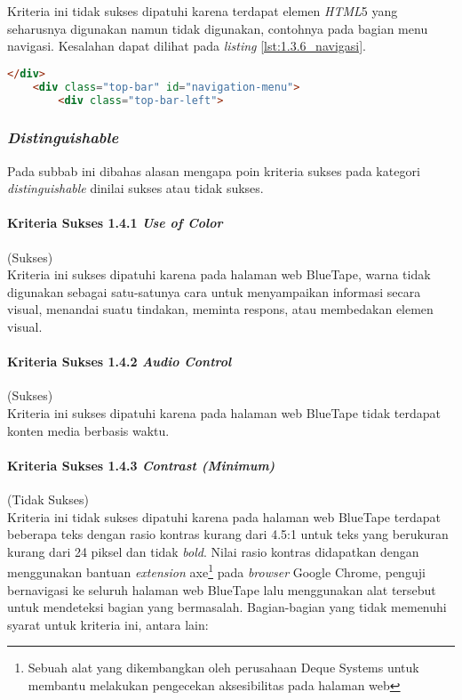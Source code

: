 Kriteria ini tidak sukses dipatuhi karena terdapat elemen \textit{HTML}5 yang seharusnya digunakan namun tidak digunakan, contohnya pada bagian menu navigasi. Kesalahan dapat dilihat pada \textit{listing} \ref{lst:1.3.6_navigasi}.

\begin{lstlisting}[frame=single, label={lst:1.3.6_navigasi}, language=HTML, caption=Pelanggaran Kriteria Sukses 1.3.6 pada Menu Navigasi]
    </div>
    <div class="top-bar" id="navigation-menu">
        <div class="top-bar-left">
\end{lstlisting}

\subsubsection{\textit{Distinguishable}}
\label{subsubsec:kepatuhan_bluetape_distinguishable}
Pada subbab ini dibahas alasan mengapa poin kriteria sukses pada kategori \textit{distinguishable} dinilai sukses atau tidak sukses.

\paragraph{Kriteria Sukses 1.4.1 \textit{Use of Color}}
\label{par:kepatuhan_bluetape_kriteria_sukses_1.4.1}
(Sukses)\\

Kriteria ini sukses dipatuhi karena pada halaman web BlueTape, warna tidak digunakan sebagai satu-satunya cara untuk menyampaikan informasi secara visual, menandai suatu tindakan, meminta respons, atau membedakan elemen visual.

\paragraph{Kriteria Sukses 1.4.2 \textit{Audio Control}}
\label{par:kepatuhan_bluetape_kriteria_sukses_1.4.2}
(Sukses)\\

Kriteria ini sukses dipatuhi karena pada halaman web BlueTape tidak terdapat konten media berbasis waktu.

\paragraph{Kriteria Sukses 1.4.3 \textit{Contrast (Minimum)}}
\label{par:kepatuhan_bluetape_kriteria_sukses_1.4.3}
(Tidak Sukses)\\

Kriteria ini tidak sukses dipatuhi karena pada halaman web BlueTape terdapat beberapa teks dengan rasio kontras kurang dari 4.5:1 untuk teks yang berukuran kurang dari 24 piksel dan tidak \textit{bold}. Nilai rasio kontras didapatkan dengan menggunakan bantuan \textit{extension} axe\footnote{Sebuah alat yang dikembangkan oleh perusahaan Deque Systems untuk membantu melakukan pengecekan aksesibilitas pada halaman web} pada \textit{browser} Google Chrome, penguji bernavigasi ke seluruh halaman web BlueTape lalu menggunakan alat tersebut untuk mendeteksi bagian yang bermasalah. Bagian-bagian yang tidak memenuhi syarat untuk kriteria ini, antara lain:

